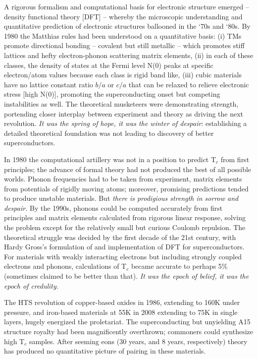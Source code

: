 \documentclass[aps,prb,twocolumn,groupedaddress]{revtex4}
\begin{document}
A rigorous formalism and computational basis for electronic structure emerged -- 
density functional theory [DFT] -- whereby the microscopic understanding and 
quantitative prediction of electronic structures ballooned in the ‘70s and ‘80s. 
By 1980 the Matthias rules had been understood on a quantitative basis: 
(i) TMs promote directional bonding -- covalent but still metallic -- which promotes 
stiff lattices and hefty electron-phonon scattering matrix elements, 
(ii) in each of these classes, the density of states at the Fermi level N(0) peaks 
at specific electron/atom values because each class is rigid band like, 
(iii) cubic materials have no lattice constant ratio $b/a$ or $c/a$ 
that can be relaxed to relieve 
electronic stress [high N(0)], promoting the superconducting onset but competing 
instabilities as well. The theoretical musketeers were demonstrating strength, 
portending closer interplay between experiment and theory as driving the next 
revolution.  {\it It was the spring of hope, it was the winter of despair}:
establishing a detailed theoretical foundation was not leading to discovery of 
better superconductors.

In 1980 the computational artillery was not in a position to predict T$_c$ from 
first principles; the advance of formal theory had not produced the best of all possible 
worlds. Phonon frequencies had to be taken from experiment, matrix elements from 
potentials of rigidly moving atoms; moreover, promising predictions tended to 
produce unstable materials. 
But {\it there is prodigious strength in sorrow and despair.}
By the 1990s, phonons could be computed 
accurately from first principles and matrix elements calculated from rigorous 
linear response, solving the problem except for the relatively small but curious 
Coulomb repulsion. The theoretical struggle was decided by the first decade of the 
21st century, with Hardy Gross's formulation of and implementation of DFT for 
superconductors.\cite{Gross} For materials with weakly interacting electrons but including 
strongly coupled electrons and phonons, calculations of T$_c$ became accurate to 
perhaps 5\% (sometimes claimed to be better than that).  {\it It was the epoch of 
belief, it was the epoch of credulity.}

The HTS revolution of copper-based oxides in 1986, extending to 160K under pressure, 
and iron-based materials at 55K in 2008 extending to 75K in single layers, hugely 
energized the proletariat. The superconducting but unyielding A15 structure 
royalty had been 
magnificently overthrown; commoners could synthesize high T$_c$ samples.  After 
seeming eons (30 years, and 8 years, respectively) theory has produced no 
quantitative picture of pairing in these materials. 
\end{document}
